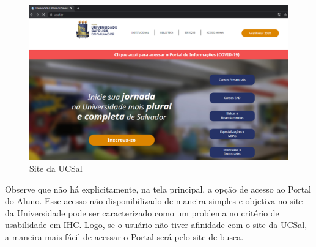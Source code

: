 \documentclass[12pt]{article}
\begin{document}
\begin{figure}[!htb]
\centering
\includegraphics[scale=0.25,frame]{img4.png}
\caption{Site da UCSal}
\label{fig:siteucsal}
\end{figure}

Observe que não há explicitamente, na tela principal, a opção de acesso ao Portal do Aluno. Esse acesso não disponibilizado de maneira simples e objetiva no site da Universidade pode ser caracterizado como um problema no critério de usabilidade em IHC. Logo, se o usuário não tiver afinidade com o site da UCSal, a maneira mais fácil de acessar o Portal será pelo site de busca. 
\end{document}
